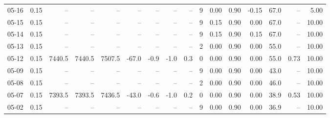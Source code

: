 \begin{threeparttable}
{\begin{tabular}{lrrrrrrrrrrrrrrr}
  05-16 &     0.15 &     -- &     -- &     -- &         -- &             -- &                       -- &                  -- &              9 &       0.00 &      0.90 &          -0.15 &             67.0 &              -- &                   5.00 \\
  05-15 &     0.15 &     -- &     -- &     -- &         -- &             -- &                       -- &                  -- &              9 &       0.15 &      0.90 &           0.00 &             67.0 &              -- &                  10.00 \\
  05-14 &     0.15 &     -- &     -- &     -- &         -- &             -- &                       -- &                  -- &              9 &       0.15 &      0.90 &           0.15 &             67.0 &              -- &                  10.00 \\
  05-13 &     0.15 &     -- &     -- &     -- &         -- &             -- &                       -- &                  -- &              2 &       0.00 &      0.90 &           0.00 &             55.0 &              -- &                  10.00 \\
  05-12 &     0.15 & 7440.5 & 7440.5 & 7507.5 &      -67.0 &           -0.9 &                     -1.0 &                 0.3 &              0 &       0.00 &      0.90 &           0.00 &             55.0 &            0.73 &                  10.00 \\
  05-09 &     0.15 &     -- &     -- &     -- &         -- &             -- &                       -- &                  -- &              9 &       0.00 &      0.90 &           0.00 &             43.0 &              -- &                  10.00 \\
  05-08 &     0.15 &     -- &     -- &     -- &         -- &             -- &                       -- &                  -- &              2 &       0.00 &      0.90 &           0.00 &             46.0 &              -- &                  10.00 \\
  05-07 &     0.15 & 7393.5 & 7393.5 & 7436.5 &      -43.0 &           -0.6 &                     -1.0 &                 0.2 &              0 &       0.00 &      0.90 &           0.00 &             38.9 &            0.53 &                  10.00 \\
  05-02 &     0.15 &     -- &     -- &     -- &         -- &             -- &                       -- &                  -- &              9 &       0.00 &      0.90 &           0.00 &             36.9 &              -- &                  10.00 \\

\end{tabular}}
\end{threeparttable}
